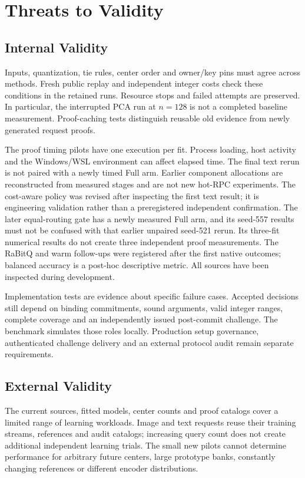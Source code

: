 \section{Threats to Validity}
\label{sec:ccd-threats}
\subsection{Internal Validity}
Inputs, quantization, tie rules, center order and owner/key pins must agree
across methods. Fresh public replay and independent integer costs check
these conditions in the retained runs. Resource stops and failed attempts
are preserved. In particular, the interrupted PCA run at $n=128$ is not a completed
baseline measurement. Proof-caching tests distinguish reusable old evidence
from newly generated request proofs.

The proof timing pilots have one execution per fit. Process loading, host
activity and the Windows/WSL environment can affect elapsed time. The final
text rerun is not paired with a newly timed Full arm. Earlier component
allocations are reconstructed from measured stages and are not new hot-RPC
experiments. The cost-aware policy was revised after inspecting the first
text result; it is engineering validation rather than a preregistered
independent confirmation. The later equal-routing gate has a newly measured
Full arm, and its seed-557 results must not be confused with that earlier
unpaired seed-521 rerun. Its three-fit numerical results do not create
three independent proof measurements. The RaBitQ and warm follow-ups were
registered after the first native outcomes; balanced accuracy is a post-hoc
descriptive metric. All sources have been inspected during development.

Implementation tests are evidence about specific failure cases. Accepted
decisions still depend on binding commitments, sound arguments, valid
integer ranges, complete coverage and an independently issued post-commit
challenge. The benchmark simulates those roles locally. Production setup
governance, authenticated challenge delivery and an external protocol audit
remain separate requirements.

\subsection{External Validity}
The current sources, fitted models, center counts and proof catalogs cover
a limited range of learning workloads. Image and text requests reuse their
training streams, references and audit catalogs; increasing query count does
not create additional independent learning trials. The small new pilots
cannot determine performance for arbitrary future centers, large prototype
banks, constantly changing references or different encoder distributions.

